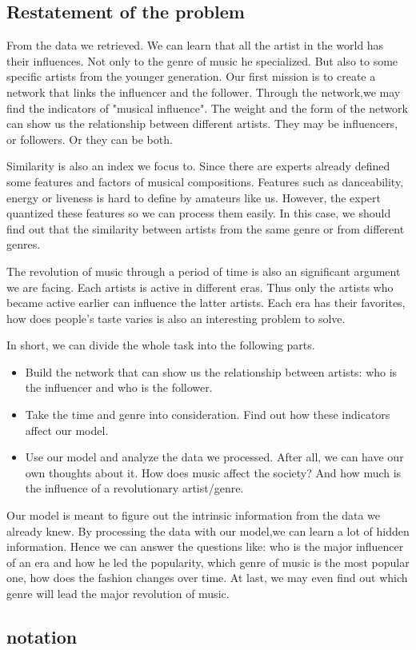 \documentclass[12pt]{article}
\begin{document}
\subsection{Restatement of the problem}\quad \quad
From the data we retrieved.\cite{1} We can learn that all the artist in the world has their influences. Not only to the genre of music he specialized. But also to some specific artists from the younger generation. Our first mission is to create a network that links the influencer and the follower. Through the network,we may find the indicators of "musical influence". The weight and the form of the network can show us the relationship between different artists. They may be influencers, or followers. Or they can be both.\par
Similarity is also an index we focus to. Since there are experts already defined some features and factors of musical compositions. Features such as danceability, energy or liveness is hard to define by amateurs like us. However, the expert quantized these features so we can process them easily. In this case, we should find out that the similarity between artists from the same genre or from different genres.\par
The revolution of music through a period of time is also an significant argument we are facing. Each artists is active in different eras. Thus only the artists who became active earlier can influence the latter artists. Each era has their favorites, how does people's taste varies is also an interesting problem to solve.\par
In short, we can divide the whole task into the following parts.
\begin{itemize}
\item Build the network that can show us the relationship between artists: who is the influencer and who is the follower.
\item Take the time and genre into consideration. Find out how these indicators affect our model.
\item Use our model and analyze the data we processed. After all, we can have our own thoughts about it. How does music affect the society? And how much is the influence of a revolutionary artist/genre.
\end{itemize}
Our model is meant to figure out the intrinsic information from the data we already knew. By processing the data with our model,we can learn a lot of hidden information. Hence we can answer the questions like: who is the major influencer of an era and how he led the popularity, which genre of music is the most popular one, how does the fashion changes over time. At last, we may even find out which genre will lead the major revolution of music.
\subsection{notation}


\end{document}
